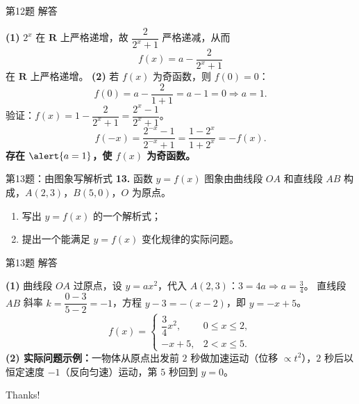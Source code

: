 \documentclass[10pt,aspectratio=169,serif]{beamer}
\begin{document}
\begin{frame}[t]{第12题 解答}
\begin{tcolorbox}[colback=orange!10,colframe=orange,title=\textbf{解}]
\textbf{(1)} $2^{x}$ 在 $\mathbf{R}$ 上严格递增，故 $\dfrac{2}{2^{x}+1}$ 严格递减，从而
\[
f(x)=a-\frac{2}{2^{x}+1}
\]
在 $\mathbf{R}$ 上\alert{严格递增}。
\smallskip
\textbf{(2)} 若 $f(x)$ 为奇函数，则 $f(0)=0$：
\[
f(0)=a-\frac{2}{1+1}=a-1=0\Rightarrow a=1.
\]
验证：$f(x)=1-\dfrac{2}{2^{x}+1}=\dfrac{2^{x}-1}{2^{x}+1}$。
\[
f(-x)=\frac{2^{-x}-1}{2^{-x}+1}=\frac{1-2^{x}}{1+2^{x}}=-f(x).
\]
\textbf{存在 }$\alert{a=1}$\textbf{，使 $f(x)$ 为奇函数。}
\end{tcolorbox}
\end{frame}

\begin{frame}[t]{第13题：由图象写解析式}
\textbf{13.} 函数 $y=f(x)$ 图象由曲线段 $OA$ 和直线段 $AB$ 构成，$A(2,3)$，$B(5,0)$，$O$ 为原点。
\begin{enumerate}[(1)]
  \item 写出 $y=f(x)$ 的一个解析式；
  \item 提出一个能满足 $y=f(x)$ 变化规律的实际问题。
\end{enumerate}
\smallskip
\begin{center}
\end{center}
\end{frame}

\begin{frame}[t]{第13题 解答}
\begin{tcolorbox}[colback=orange!10,colframe=orange,title=\textbf{解}]
\textbf{(1)} 曲线段 $OA$ 过原点，设 $y=ax^{2}$，代入 $A(2,3)$：$3=4a\Rightarrow a=\tfrac34$。
直线段 $AB$ 斜率 $k=\dfrac{0-3}{5-2}=-1$，方程 $y-3=-(x-2)$，即 $y=-x+5$。
\[
f(x)=\begin{cases}
\dfrac34 x^{2}, & 0\le x\le 2,\\[4pt]
-x+5, & 2<x\le 5.
\end{cases}
\]
\smallskip
\textbf{(2) 实际问题示例：}一物体从原点出发前 $2$ 秒做加速运动（位移 $\propto t^{2}$），$2$ 秒后以恒定速度 $-1$（反向匀速）运动，第 $5$ 秒回到 $y=0$。
\end{tcolorbox}
\end{frame}

\begin{frame}[c]
  \begin{center}
    {\Huge\calligra Thanks!}
  \end{center}
\end{frame}
\end{document}
